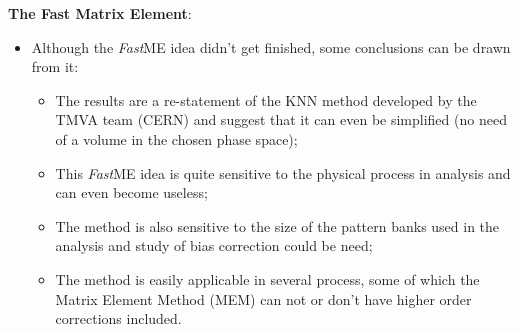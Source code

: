 {\flushleft \textbf{The Fast Matrix Element}:}
\begin{itemize}
	\item Although the \textit{Fast}ME idea didn't get finished, some conclusions can be drawn from it:
	\begin{itemize}
		\item The results are a re-statement of the KNN method developed by the TMVA team (CERN) and suggest that it can even be simplified (no need of a volume in the chosen phase space);
		\item This \textit{Fast}ME idea is quite sensitive to the physical process in analysis and can even become useless;
		\item The method is also sensitive to the size of the pattern banks used in the analysis and study of bias correction could be need;
		\item The method is easily applicable in several process, some of which the Matrix Element Method (MEM) can not or don't have higher order corrections included.
	\end{itemize}
\end{itemize}
	

